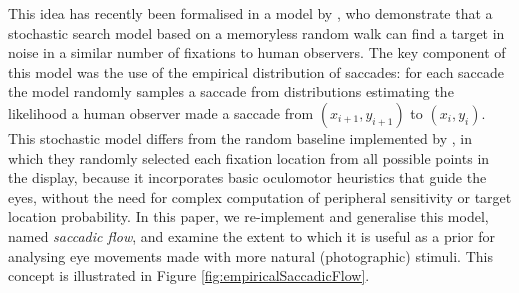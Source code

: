 This idea has recently been formalised in a model by \cite{clarke2015}, who demonstrate that a stochastic search model based on a memoryless random walk can find a target in noise in a similar number of fixations to human observers. The key component of this model was the use of the empirical distribution of saccades: for each saccade the model randomly samples a saccade from distributions estimating the likelihood a human observer made a saccade from $(x_{i+1},y_{i+1})$ to $(x_i,y_i)$. This stochastic model differs from the random baseline implemented by \cite{najemnik-geisler2008}, in which they randomly selected each fixation location from all possible points in the display, because it incorporates basic oculomotor heuristics that guide the eyes, without the need for complex computation of peripheral sensitivity or target location probability. In this paper, we re-implement and generalise this model, named \textit{saccadic flow}, and examine the extent to which it is useful as a prior for analysing eye movements made with more natural (photographic) stimuli. This concept is illustrated in Figure \ref{fig:empiricalSaccadicFlow}. 
